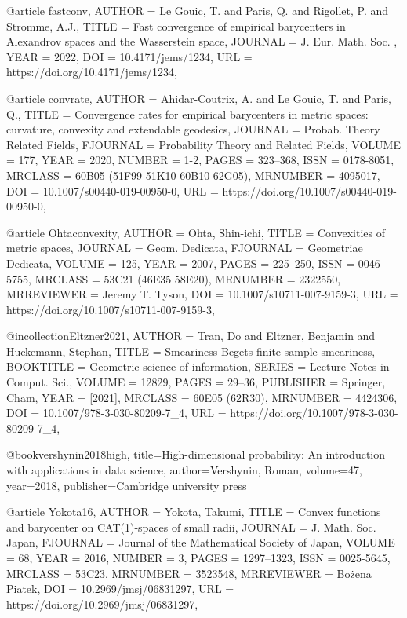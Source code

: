 @article {fastconv,
    AUTHOR = {Le Gouic, T. and Paris, Q. and Rigollet, P. and Stromme, A.J.},
     TITLE = {Fast convergence of empirical barycenters in {A}lexandrov spaces and the {W}asserstein space},
   JOURNAL = {J. Eur. Math. Soc. },
      YEAR = {2022},
       DOI = {10.4171/jems/1234},
       URL = {https://doi.org/10.4171/jems/1234},
}

@article {convrate,
    AUTHOR = {Ahidar-Coutrix, A. and Le Gouic, T. and Paris, Q.},
     TITLE = {Convergence rates for empirical barycenters in metric spaces:
              curvature, convexity and extendable geodesics},
   JOURNAL = {Probab. Theory Related Fields},
  FJOURNAL = {Probability Theory and Related Fields},
    VOLUME = {177},
      YEAR = {2020},
    NUMBER = {1-2},
     PAGES = {323--368},
      ISSN = {0178-8051},
   MRCLASS = {60B05 (51F99 51K10 60B10 62G05)},
  MRNUMBER = {4095017},
       DOI = {10.1007/s00440-019-00950-0},
       URL = {https://doi.org/10.1007/s00440-019-00950-0},
}

@article {Ohtaconvexity,
    AUTHOR = {Ohta, Shin-ichi},
     TITLE = {Convexities of metric spaces},
   JOURNAL = {Geom. Dedicata},
  FJOURNAL = {Geometriae Dedicata},
    VOLUME = {125},
      YEAR = {2007},
     PAGES = {225--250},
      ISSN = {0046-5755},
   MRCLASS = {53C21 (46E35 58E20)},
  MRNUMBER = {2322550},
MRREVIEWER = {Jeremy T. Tyson},
       DOI = {10.1007/s10711-007-9159-3},
       URL = {https://doi.org/10.1007/s10711-007-9159-3},
}

@incollection{Eltzner2021,
    AUTHOR = {Tran, Do and Eltzner, Benjamin and Huckemann, Stephan},
     TITLE = {Smeariness {B}egets finite sample smeariness},
 BOOKTITLE = {Geometric science of information},
    SERIES = {Lecture Notes in Comput. Sci.},
    VOLUME = {12829},
     PAGES = {29--36},
 PUBLISHER = {Springer, Cham},
      YEAR = {[2021]},
   MRCLASS = {60E05 (62R30)},
  MRNUMBER = {4424306},
       DOI = {10.1007/978-3-030-80209-7\_4},
       URL = {https://doi.org/10.1007/978-3-030-80209-7_4},
}


@book{vershynin2018high,
  title={High-dimensional probability: An introduction with applications in data science},
  author={Vershynin, Roman},
  volume={47},
  year={2018},
  publisher={Cambridge university press}
}


@article {Yokota16,
    AUTHOR = {Yokota, Takumi},
     TITLE = {Convex functions and barycenter on {CAT}(1)-spaces of small
              radii},
   JOURNAL = {J. Math. Soc. Japan},
  FJOURNAL = {Journal of the Mathematical Society of Japan},
    VOLUME = {68},
      YEAR = {2016},
    NUMBER = {3},
     PAGES = {1297--1323},
      ISSN = {0025-5645},
   MRCLASS = {53C23},
  MRNUMBER = {3523548},
MRREVIEWER = {Bo\.{z}ena Pi\polhk atek},
       DOI = {10.2969/jmsj/06831297},
       URL = {https://doi.org/10.2969/jmsj/06831297},
}

